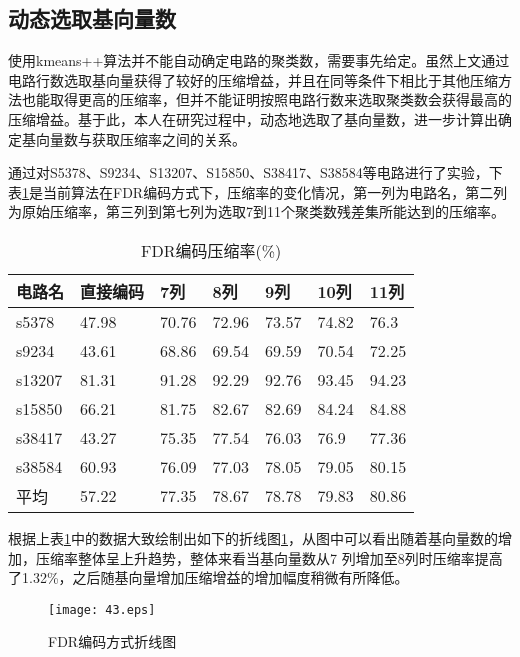 \subsection{动态选取基向量数}

使用kmeans++算法并不能自动确定电路的聚类数，需要事先给定。虽然上文通过电路行数选取基向量获得了较好的压缩增益，并且在同等条件下相比于其他压缩方法也能取得更高的压缩率，但并不能证明按照电路行数来选取聚类数会获得最高的压缩增益。基于此，本人在研究过程中，动态地选取了基向量数，进一步计算出确定基向量数与获取压缩率之间的关系。

通过对S5378、S9234、S13207、S15850、S38417、S38584等电路进行了实验，下表\ref{ptabl10}是当前算法在FDR编码方式下，压缩率的变化情况，第一列为电路名，第二列为原始压缩率，第三列到第七列为选取7到11个聚类数残差集所能达到的压缩率。

\begin{table}[H]
\centering
\caption{FDR编码压缩率(\%)}\label{ptabl10}
\begin{tabular}{p{1.4cm}p{2cm}<{\centering}p{1.8cm}<{\centering}p{1.8cm}<{\centering}p{1.8cm}<{\centering}
p{1.8cm}<{\centering}p{1.8cm}<{\centering}}
\toprule
\textbf{电路名}&	\textbf{直接编码}& \textbf{7列}& \textbf{8列}& \textbf{9列}& \textbf{10列}& \textbf{11列}\\
\midrule
s5378&	47.98&	70.76&	72.96&	73.57&	74.82&	76.3\\
s9234&	43.61&	68.86&	69.54&	69.59&	70.54&	72.25\\
s13207&	81.31&	91.28&	92.29&	92.76&	93.45&	94.23\\
s15850&	66.21&	81.75&	82.67&	82.69&	84.24&	84.88\\
s38417&	43.27&	75.35&	77.54&	76.03&	76.9&	77.36\\
s38584&	60.93&	76.09&	77.03&	78.05&	79.05&	80.15\\
平均&	57.22&	77.35&	78.67&	78.78&	79.83&	80.86\\
\bottomrule
\end{tabular}
\end{table}

根据上表\ref{ptabl10}中的数据大致绘制出如下的折线图\ref{43}，从图中可以看出随着基向量数的增加，压缩率整体呈上升趋势，整体来看当基向量数从7 列增加至8列时压缩率提高了1.32\%，之后随基向量增加压缩增益的增加幅度稍微有所降低。

\begin{figure}[H]
  \centering
  \texttt{[image: 43.eps]}
  \caption{FDR编码方式折线图}\label{43}
     \end{figure}

